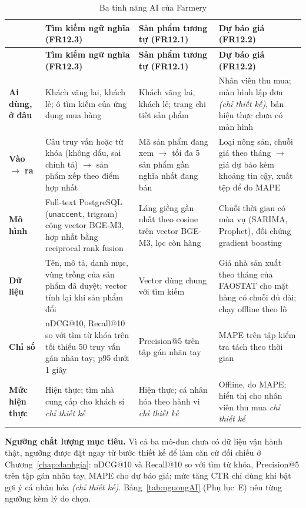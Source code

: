 \begingroup
\tblsetup\tblzebra
\begin{longtable}{L{2.30cm} L{4.20cm} L{4.20cm} L{4.20cm}}
\caption{Ba tính năng AI của Farmery}
\label{tab:tinhnangAI} \\
\toprule
{}
& \textbf{Tìm kiếm ngữ nghĩa (FR12.3)} & \textbf{Sản phẩm tương tự (FR12.1)} & \textbf{Dự báo giá (FR12.2)} \\
\midrule
\endfirsthead
\toprule
{}
& \textbf{Tìm kiếm ngữ nghĩa (FR12.3)} & \textbf{Sản phẩm tương tự (FR12.1)} & \textbf{Dự báo giá (FR12.2)} \\
\midrule
\endhead
\bottomrule
\endfoot
\textbf{Ai dùng, ở đâu} & Khách vãng lai, khách lẻ; ô tìm kiếm của ứng dụng mua hàng & Khách vãng lai, khách lẻ; trang chi tiết sản phẩm & Nhân viên thu mua; màn hình lập đơn \emph{(chỉ thiết kế)}, bản hiện thực chưa có màn hình \\
\textbf{Vào $\rightarrow$ ra} & Câu truy vấn hoặc từ khóa (không dấu, sai chính tả) $\rightarrow$ sản phẩm xếp theo điểm hợp nhất & Mã sản phẩm đang xem $\rightarrow$ tối đa 5 sản phẩm gần nghĩa nhất đang bán & Loại nông sản, chuỗi giá theo tháng $\rightarrow$ giá dự báo kèm khoảng tin cậy, xuất tệp để đo MAPE \\
\textbf{Mô hình} & Full-text PostgreSQL (\texttt{unaccent}, trigram) cộng vector BGE-M3, hợp nhất bằng reciprocal rank fusion & Láng giềng gần nhất theo cosine trên vector BGE-M3, lọc còn hàng & Chuỗi thời gian có mùa vụ (SARIMA, Prophet), đối chứng gradient boosting \\
\textbf{Dữ liệu} & Tên, mô tả, danh mục, vùng trồng của sản phẩm đã duyệt; vector tính lại khi sản phẩm đổi & Vector dùng chung với tìm kiếm & Giá nhà sản xuất theo tháng của FAOSTAT cho mặt hàng có chuỗi đủ dài; chạy offline theo lô \\
\textbf{Chỉ số} & nDCG@10, Recall@10 so với tìm từ khóa trên tối thiểu 50 truy vấn gán nhãn tay; p95 dưới 1 giây & Precision@5 trên tập gán nhãn tay & MAPE trên tập kiểm tra tách theo thời gian \\
\textbf{Mức hiện thực} & Hiện thực; tìm nhà cung cấp cho khách sỉ \emph{chỉ thiết kế} & Hiện thực; cá nhân hóa theo hành vi \emph{chỉ thiết kế} & Offline, đo MAPE; hiển thị cho nhân viên thu mua \emph{chỉ thiết kế} \\
\end{longtable}
\endgroup

\noindent\textbf{Ngưỡng chất lượng mục tiêu.}\label{subsec:nguongAI} Vì cả ba mô-đun chưa có dữ liệu vận hành thật, ngưỡng được đặt ngay từ bước thiết kế để làm căn cứ đối chiếu ở Chương~\ref{chap:danhgia}: nDCG@10 và Recall@10 so với tìm từ khóa, Precision@5 trên tập gán nhãn tay, MAPE cho dự báo giá; mức tăng CTR chỉ dùng khi bật gợi ý cá nhân hóa \emph{(chỉ thiết kế)}. Bảng~\ref{tab:nguongAI} (Phụ lục~E) nêu từng ngưỡng kèm lý do chọn.

